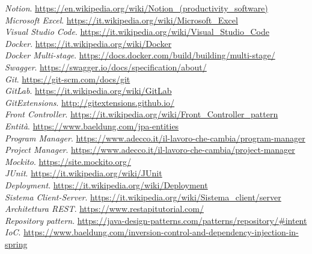 \smallskip
\textit{Notion}. \url{https://en.wikipedia.org/wiki/Notion\_(productivity\_software)}\\
\smallskip
\textit{Microsoft Excel}. \url{https://it.wikipedia.org/wiki/Microsoft\_Excel}\\
\smallskip
\textit{Visual Studio Code}. \url{https://it.wikipedia.org/wiki/Visual\_Studio\_Code}\\
\smallskip
\textit{Docker}. \url{https://it.wikipedia.org/wiki/Docker}\\
\smallskip
\textit{Docker Multi-stage}. \url{https://docs.docker.com/build/building/multi-stage/}\\
\smallskip
\textit{Swagger}. \url{https://swagger.io/docs/specification/about/}\\
\smallskip
\textit{Git}. \url{https://git-scm.com/docs/git}\\
\smallskip
\textit{GitLab}. \url{https://it.wikipedia.org/wiki/GitLab}\\
\smallskip
\textit{GitExtensions}. \url{http://gitextensions.github.io/}\\
\smallskip
\textit{Front Controller}. \url{https://it.wikipedia.org/wiki/Front\_Controller\_pattern}\\
\smallskip %
\textit{Entità}. \url{https://www.baeldung.com/jpa-entities}\\
\smallskip
\textit{Program Manager}. \url{https://www.adecco.it/il-lavoro-che-cambia/program-manager}\\
\smallskip
\textit{Project Manager}. \url{https://www.adecco.it/il-lavoro-che-cambia/project-manager}\\
\smallskip
\textit{Mockito}. \url{https://site.mockito.org/}\\
\smallskip %
\textit{JUnit}. \url{https://it.wikipedia.org/wiki/JUnit}\\
\smallskip %
\textit{Deployment}. \url{https://it.wikipedia.org/wiki/Deployment}\\
\smallskip %
\textit{Sistema Client-Server}. \url{https://it.wikipedia.org/wiki/Sistema\_client/server}\\
\smallskip %
\textit{Architettura REST}. \url{https://www.restapitutorial.com/}\\
\smallskip %
\textit{Repository pattern}. \url{https://java-design-patterns.com/patterns/repository/\#intent}\\
\smallskip %
\textit{IoC}. \url{https://www.baeldung.com/inversion-control-and-dependency-injection-in-spring}\\
